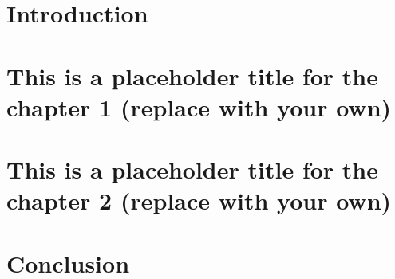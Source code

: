 \documentclass[12pt,oneside,letterpaper]{report}
\begin{document}
\cleardoublepage
{}
{}
\listofappendices
\newpage





\chapter{Introduction} \label{ch_introductory}


\chapter{This is a placeholder title for the chapter 1 (replace with your own)} \label{ch_chapter1}


\chapter{This is a placeholder title for the chapter 2 (replace with your own)} \label{ch_chapter2}


\chapter{Conclusion} \label{ch_conclusion}




\end{document}
